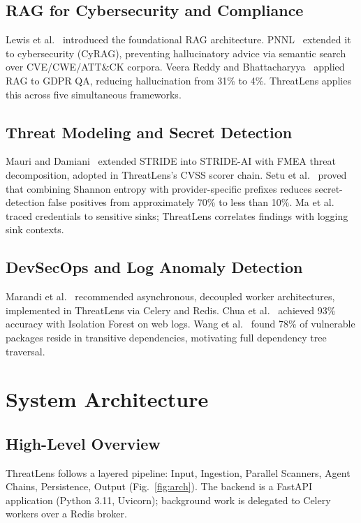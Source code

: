 \documentclass[conference]{IEEEtran}
\begin{document}
\subsection{RAG for Cybersecurity and Compliance}
Lewis et al.~\cite{lewis2020rag} introduced the foundational RAG
architecture. PNNL~\cite{pnnl2024cyrag} extended it to cybersecurity
(CyRAG), preventing hallucinatory advice via semantic search over
CVE/CWE/ATT\&CK corpora. Veera Reddy and
Bhattacharyya~\cite{veeraReddy2024} applied RAG to GDPR QA, reducing
hallucination from 31\% to 4\%. ThreatLens applies this across five
simultaneous frameworks.

\subsection{Threat Modeling and Secret Detection}
Mauri and Damiani~\cite{mauri2022stride} extended STRIDE into STRIDE-AI
with FMEA threat decomposition, adopted in ThreatLens's CVSS scorer
chain. Setu et al.~\cite{setu2023secretbench} proved that combining
Shannon entropy with provider-specific prefixes reduces secret-detection
false positives from approximately 70\% to less than 10\%. Ma
et al.~\cite{ma2024seagull} traced credentials to sensitive sinks;
ThreatLens correlates findings with logging sink contexts.

\subsection{DevSecOps and Log Anomaly Detection}
Marandi et al.~\cite{marandi2023devsecops} recommended asynchronous,
decoupled worker architectures, implemented in ThreatLens via Celery and
Redis. Chua et al.~\cite{chua2024iforest} achieved 93\% accuracy with
Isolation Forest on web logs. Wang et al.~\cite{wang2024vulndeps} found
78\% of vulnerable packages reside in transitive dependencies, motivating
full dependency tree traversal.

\section{System Architecture}
\label{sec:architecture}

\subsection{High-Level Overview}
ThreatLens follows a layered pipeline: Input, Ingestion, Parallel
Scanners, Agent Chains, Persistence, Output (Fig.~\ref{fig:arch}).
The backend is a FastAPI~\cite{fastapi} application (Python 3.11,
Uvicorn); background work is delegated to Celery workers over a Redis
broker.
\end{document}
